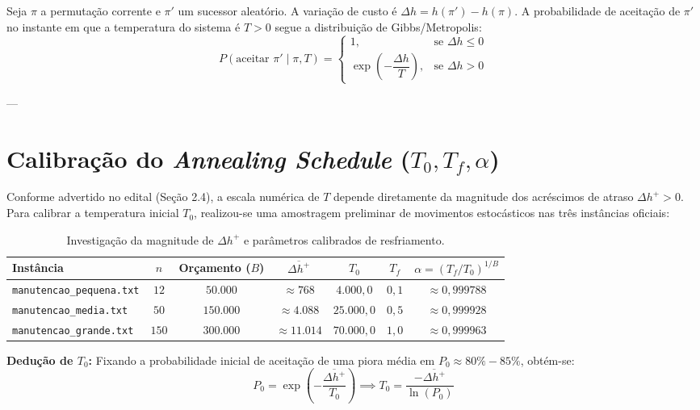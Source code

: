 \documentclass[11pt,a4paper]{article}
\begin{document}
Seja $\pi$ a permutação corrente e $\pi'$ um sucessor aleatório. A variação de custo é $\Delta h = h(\pi') - h(\pi)$. A probabilidade de aceitação de $\pi'$ no instante em que a temperatura do sistema é $T > 0$ segue a distribuição de Gibbs/Metropolis:
\begin{equation}
P(\text{aceitar } \pi' \mid \pi, T) = 
\begin{cases} 
1, & \text{se } \Delta h \le 0 \\
\exp\left(-\dfrac{\Delta h}{T}\right), & \text{se } \Delta h > 0 
\end{cases}
\end{equation}

---

\section{Calibração do \textit{Annealing Schedule} ($T_0, T_f, \alpha$)}

Conforme advertido no edital (Seção 2.4), a escala numérica de $T$ depende diretamente da magnitude dos acréscimos de atraso $\Delta h^+ > 0$. Para calibrar a temperatura inicial $T_0$, realizou-se uma amostragem preliminar de movimentos estocásticos nas três instâncias oficiais:

\begin{table}[h!]
\centering
\small
\caption{Investigação da magnitude de $\Delta h^+$ e parâmetros calibrados de resfriamento.}
\label{tab:calibracao}
\begin{tabular}{lcccccc}
\toprule
\textbf{Instância} & $n$ & \textbf{Orçamento ($B$)} & $\overline{\Delta h^+}$ & $T_0$ & $T_f$ & $\alpha = (T_f / T_0)^{1/B}$ \\
\midrule
\texttt{manutencao\_pequena.txt}  & $12$  & $50.000$  & $\approx 768$   & $4.000,0$  & $0,1$ & $\approx 0,999788$ \\
\texttt{manutencao\_media.txt}    & $50$  & $150.000$ & $\approx 4.088$ & $25.000,0$ & $0,5$ & $\approx 0,999928$ \\
\texttt{manutencao\_grande.txt}   & $150$ & $300.000$ & $\approx 11.014$& $70.000,0$ & $1,0$ & $\approx 0,999963$ \\
\bottomrule
\end{tabular}
\end{table}

\noindent\textbf{Dedução de $T_0$:} Fixando a probabilidade inicial de aceitação de uma piora média em $P_0 \approx 80\% - 85\%$, obtém-se:
\begin{equation}
P_0 = \exp\left(-\frac{\overline{\Delta h^+}}{T_0}\right) \implies T_0 = \frac{-\overline{\Delta h^+}}{\ln(P_0)}
\end{equation}
\end{document}
